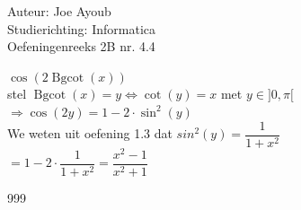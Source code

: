 \documentclass[a4paper]{article}
\newcommand{\Bgcot}{\operatorname{Bgcot}}
\begin{document}
\noindent \large Auteur: Joe Ayoub \\
\noindent \large Studierichting: Informatica\\
\noindent \large Oefeningenreeks 2B nr. 4.4\\

\medskip

\normalsize

$\cos(2\Bgcot(x))$ \\

stel $\Bgcot(x) = y \Leftrightarrow \cot(y) = x$ met $y \in ]0,\pi[$ \\

$\Rightarrow \cos(2y) = 1 - 2\cdot \sin^2(y)$ \\

We weten uit oefening 1.3 dat $sin^2(y) = \dfrac{1}{1+x^2}$ \\

$ = 1 - 2 \cdot \dfrac{1}{1 + x^2} = \dfrac{x^2 - 1}{x^2 + 1}$ \\

\begin{thebibliography}{999}

\end{thebibliography}
\end{document}
